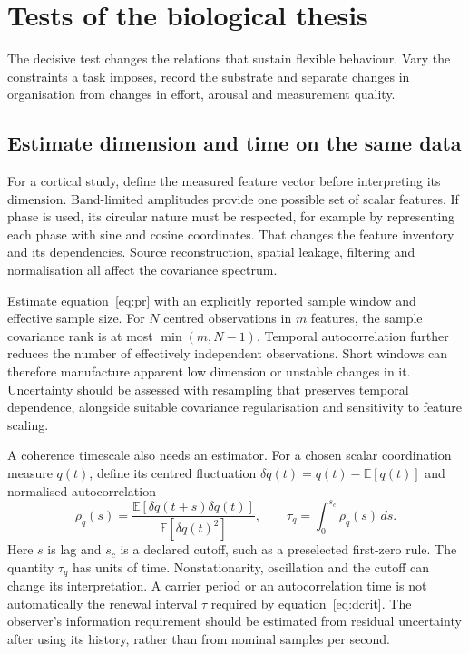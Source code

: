 \documentclass[11pt,a4paper]{article}
\begin{document}
\section{Tests of the biological thesis}
\label{sec:tests}

The decisive test changes the relations that sustain flexible behaviour. Vary the constraints a task imposes, record the substrate and separate changes in organisation from changes in effort, arousal and measurement quality.

\subsection{Estimate dimension and time on the same data}

For a cortical study, define the measured feature vector before interpreting its dimension. Band-limited amplitudes provide one possible set of scalar features. If phase is used, its circular nature must be respected, for example by representing each phase with sine and cosine coordinates. That changes the feature inventory and its dependencies. Source reconstruction, spatial leakage, filtering and normalisation all affect the covariance spectrum.

Estimate equation~\eqref{eq:pr} with an explicitly reported sample window and effective sample size. For \(N\) centred observations in \(m\) features, the sample covariance rank is at most \(\min(m,N-1)\). Temporal autocorrelation further reduces the number of effectively independent observations. Short windows can therefore manufacture apparent low dimension or unstable changes in it. Uncertainty should be assessed with resampling that preserves temporal dependence, alongside suitable covariance regularisation and sensitivity to feature scaling.

A coherence timescale also needs an estimator. For a chosen scalar coordination measure \(q(t)\), define its centred fluctuation \(\delta q(t)=q(t)-\mathbb E[q(t)]\) and normalised autocorrelation
\begin{equation}
 \rho_q(s)=
 \frac{\mathbb E[\delta q(t+s)\delta q(t)]}
 {\mathbb E[\delta q(t)^2]},
 \qquad
 \tau_q=\int_0^{s_c}\rho_q(s)\,ds .
 \label{eq:correlation}
\end{equation}
Here \(s\) is lag and \(s_c\) is a declared cutoff, such as a preselected first-zero rule. The quantity \(\tau_q\) has units of time. Nonstationarity, oscillation and the cutoff can change its interpretation. A carrier period or an autocorrelation time is not automatically the renewal interval \(\tau\) required by equation~\eqref{eq:dcrit}. The observer's information requirement should be estimated from residual uncertainty after using its history, rather than from nominal samples per second.
\end{document}
